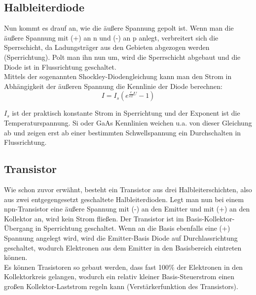 \documentclass{article}
\begin{document}
\subsection{Halbleiterdiode}
Nun kommt es drauf an, wie die äußere Spannung gepolt ist. Wenn man die äußere Spannung mit (+) an n und (-) an p anlegt, verbreitert sich die Sperrschicht, da Ladungsträger aus den Gebieten abgezogen werden (Sperrichtung). Polt man ihn nun um, wird die Sperrschicht abgebaut und die Diode ist in Flussrichtung geschaltet.\\
Mittels der sogenannten Shockley-Diodengleichung kann man den Strom in Abhängigkeit der äußeren Spannung die Kennlinie der Diode berechnen:
\begin{equation}
I=I_s \left(e^{\frac{e}{kT}U}-1\right)
\end{equation}

\(I_s\) ist der praktisch konstante Strom in Sperrichtung und der Exponent ist die Temperaturspannung. Si oder GaAs Kennlinien weichen u.a. von dieser Gleichung ab und zeigen erst ab einer bestimmten Schwellspannung ein Durchschalten in Flussrichtung.

\subsection{Transistor}
Wie schon zuvor erwähnt, besteht ein Transistor aus drei Halbleiterschichten, also aus zwei entgegengesetzt geschaltete Halbleiterdioden. Legt man nun bei einem npn-Transistor eine äußere Spannung mit (-) an den Emitter und mit (+) an den Kollektor an, wird kein Strom fließen. Der Transistor ist im Basis-Kollektor-Übergang in Sperrichtung geschaltet. Wenn an die Basis ebenfalls eine (+) Spannung angelegt wird, wird die Emitter-Basis Diode auf Durchlassrichtung geschaltet, wodurch Elektronen aus dem Emitter in den Basisbereich eintreten können.\\
Es können Trasistoren so gebaut werden, dass fast 100\(\%\) der Elektronen in den Kollektorkreis gelangen, wodurch ein relativ kleiner Basis-Steuerstrom einen großen Kollektor-Laststrom regeln kann (Verstärkerfunktion des Transistors).

\begin{center}
\begin{minipage}{\linewidth}
\centering
{}
%
\label{transistor}
\end{minipage}
\end{center}
\end{document}
